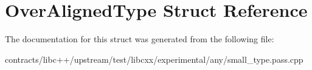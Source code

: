 \hypertarget{struct_over_aligned_type}{}\section{Over\+Aligned\+Type Struct Reference}
\label{struct_over_aligned_type}


The documentation for this struct was generated from the following file\+:\begin{DoxyCompactItemize}
\item 
contracts/libc++/upstream/test/libcxx/experimental/any/small\+\_\+type.\+pass.\+cpp\end{DoxyCompactItemize}
